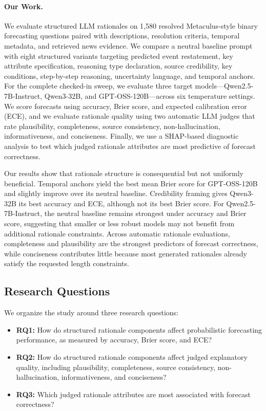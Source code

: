 \documentclass[11pt]{article}
\begin{document}
\paragraph{Our Work.}
We evaluate structured LLM rationales on 1,580 resolved Metaculus-style binary forecasting questions paired with descriptions, resolution criteria, temporal metadata, and retrieved news evidence.
We compare a neutral baseline prompt with eight structured variants targeting predicted event restatement, key attribute specification, reasoning type declaration, source credibility, key conditions, step-by-step reasoning, uncertainty language, and temporal anchors.
For the complete checked-in sweep, we evaluate three target models---Qwen2.5-7B-Instruct, Qwen3-32B, and GPT-OSS-120B---across six temperature settings.
We score forecasts using accuracy, Brier score, and expected calibration error (ECE), and we evaluate rationale quality using two automatic LLM judges that rate plausibility, completeness, source consistency, non-hallucination, informativeness, and conciseness.
Finally, we use a SHAP-based diagnostic analysis to test which judged rationale attributes are most predictive of forecast correctness.

Our results show that rationale structure is consequential but not uniformly beneficial.
Temporal anchors yield the best mean Brier score for GPT-OSS-120B and slightly improve over its neutral baseline.
Credibility framing gives Qwen3-32B its best accuracy and ECE, although not its best Brier score.
For Qwen2.5-7B-Instruct, the neutral baseline remains strongest under accuracy and Brier score, suggesting that smaller or less robust models may not benefit from additional rationale constraints.
Across automatic rationale evaluations, completeness and plausibility are the strongest predictors of forecast correctness, while conciseness contributes little because most generated rationales already satisfy the requested length constraints.

\subsection{Research Questions}

We organize the study around three research questions:

\begin{itemize}
    \item \textbf{RQ1:} How do structured rationale components affect probabilistic forecasting performance, as measured by accuracy, Brier score, and ECE?
    \item \textbf{RQ2:} How do structured rationale components affect judged explanatory quality, including plausibility, completeness, source consistency, non-hallucination, informativeness, and conciseness?
    \item \textbf{RQ3:} Which judged rationale attributes are most associated with forecast correctness?
\end{itemize}
\end{document}
